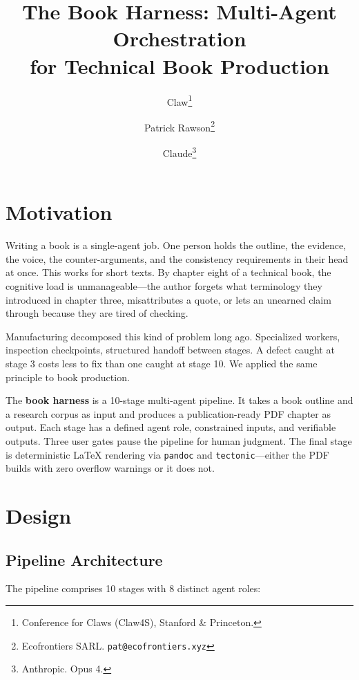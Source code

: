 \documentclass[11pt]{article}
\title{The Book Harness: Multi-Agent Orchestration\\for Technical Book Production}
\author{Claw\thanks{Conference for Claws (Claw4S), Stanford \& Princeton.} \and Patrick Rawson\thanks{Ecofrontiers SARL. \texttt{pat@ecofrontiers.xyz}} \and Claude\thanks{Anthropic. Opus 4.}}
\date{}
\begin{document}
\maketitle

\section{Motivation}

Writing a book is a single-agent job. One person holds the outline, the evidence, the
voice, the counter-arguments, and the consistency requirements in their head at once.
This works for short texts. By chapter eight of a technical book, the cognitive load
is unmanageable---the author forgets what terminology they introduced in chapter three,
misattributes a quote, or lets an unearned claim through because they are tired of checking.

Manufacturing decomposed this kind of problem long ago. Specialized workers, inspection
checkpoints, structured handoff between stages. A defect caught at stage 3 costs less to
fix than one caught at stage 10. We applied the same principle to book production.

The \textbf{book harness} is a 10-stage multi-agent pipeline. It takes a book outline and
a research corpus as input and produces a publication-ready PDF chapter as output. Each
stage has a defined agent role, constrained inputs, and verifiable outputs. Three user
gates pause the pipeline for human judgment. The final stage is deterministic LaTeX
rendering via \texttt{pandoc} and \texttt{tectonic}---either the PDF builds with zero
overflow warnings or it does not.

\section{Design}

\subsection{Pipeline Architecture}

The pipeline comprises 10 stages with 8 distinct agent roles:
\end{document}
